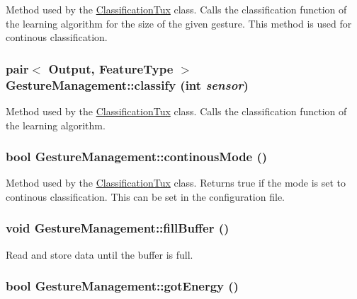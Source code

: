 \label{classGestureManagement_a640061cf24cb6663bb6a9660cb53ad18}
Method used by the \hyperlink{classClassificationTux}{ClassificationTux} class. Calls the classification function of the learning algorithm for the size of the given gesture. This method is used for continous classification. \hypertarget{classGestureManagement_a3a2a232f68bcd55aa546df2df8c2faf4}{
\subsubsection[{classify}]{\setlength{\rightskip}{0pt plus 5cm}pair$<$ {\bf Output}, FeatureType $>$ GestureManagement::classify (int {\em sensor})}}
\label{classGestureManagement_a3a2a232f68bcd55aa546df2df8c2faf4}
Method used by the \hyperlink{classClassificationTux}{ClassificationTux} class. Calls the classification function of the learning algorithm. \hypertarget{classGestureManagement_ac1cb3b54aca326d1f38d856b10c41d36}{
\subsubsection[{continousMode}]{\setlength{\rightskip}{0pt plus 5cm}bool GestureManagement::continousMode ()}}
\label{classGestureManagement_ac1cb3b54aca326d1f38d856b10c41d36}
Method used by the \hyperlink{classClassificationTux}{ClassificationTux} class. Returns true if the mode is set to continous classification. This can be set in the configuration file. \hypertarget{classGestureManagement_aa9c5c851135b6c6f71201daa8bbcfe60}{
\subsubsection[{fillBuffer}]{\setlength{\rightskip}{0pt plus 5cm}void GestureManagement::fillBuffer ()}}
\label{classGestureManagement_aa9c5c851135b6c6f71201daa8bbcfe60}
Read and store data until the buffer is full. \hypertarget{classGestureManagement_a792bf83b1fe0b7cd3adee6a1ad967683}{
\subsubsection[{gotEnergy}]{\setlength{\rightskip}{0pt plus 5cm}bool GestureManagement::gotEnergy ()}}
